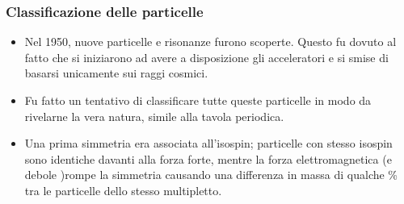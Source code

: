\subsubsection{Classificazione delle particelle}
\begin{itemize}
\item Nel 1950, nuove particelle e risonanze furono scoperte. Questo fu dovuto al fatto che si iniziarono ad avere a disposizione gli acceleratori e si smise di basarsi unicamente sui raggi cosmici. 
\item Fu fatto un tentativo di classificare tutte queste particelle in modo da rivelarne la vera natura, simile alla tavola periodica. 
\item Una prima simmetria era associata all'isospin; particelle con stesso isospin sono identiche davanti alla forza forte, mentre la forza elettromagnetica (e debole )rompe la simmetria causando una differenza in massa di qualche \% tra le particelle dello stesso multipletto.
\end{itemize}
